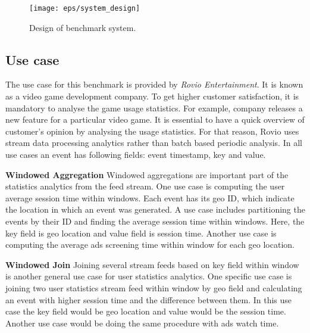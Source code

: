 %
%

\begin{figure*}[h]
\centering
\texttt{[image: eps/system\_design]}
\caption{Design of benchmark system.}
\label{fig_design}
\end{figure*}

\subsection{Use case}
The use case for this benchmark is provided by \textit{ Rovio Entertainment}. It is known as a video game development company. To get higher customer satisfaction, it is mandatory to analyse the game usage statistics. For example, company releases a new feature for a particular video game. It is essential to have a quick overview of customer's opinion by analysing the usage statistics. For that reason, Rovio uses stream data processing analytics rather than batch based periodic analysis.  In all use cases an event has following fields: event timestamp, key and value. 

\textbf{Windowed Aggregation}
Windowed aggregations are important part of the statistics analytics from the feed stream. One use case is computing the user average session time within windows. Each event has its geo ID, which indicate the location in which an event was generated. A use case includes partitioning the events by their ID and finding the average session time within windows. Here, the key field is geo location and value field is session time. Another use case is computing the average ads screening time within window for each geo location. 

\textbf{Windowed Join}
Joining several stream feeds based on key field within window is another general use case for user statistics analytics. One specific use case is joining two user statistics stream feed within window by geo field and calculating an event with higher session time and the difference between them. In this use case the key field would be geo location and value would be the session time. Another use case would be doing the same procedure with ads watch time. 



